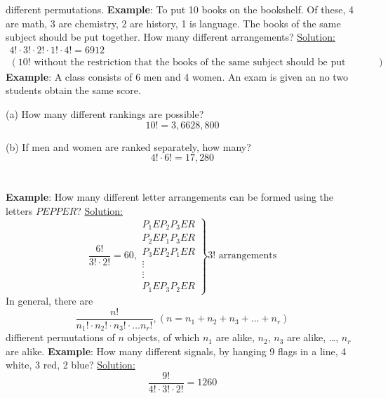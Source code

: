 \documentclass[11pt, letterpaper]{article}
\begin{document}
different permutations. \newline \newline
\noindent
\textbf{Example}: To put 10 books on the bookshelf. Of these, 4 are math, 3 are chemistry, 2 are history, 1 is language. The books of the same subject should be put together. How many different arrangements? \newline \newline
\noindent
\underline{Solution:}
\begin{multline*}
  4! \cdot 3! \cdot 2! \cdot 1! \cdot 4! = 6912 \\
  (10!\text{ without the restriction that the books of the same subject should be put together})
\end{multline*}
\textbf{Example}: A class consists of 6 men and 4 women. An exam is given an no two students obtain the same score.

(a) How many different rankings are possible?
\begin{equation*}
  10! = 3,6628,800
\end{equation*}

(b) If men and women are ranked separately, how many?
\begin{equation*}
  4! \cdot 6! = 17,280
\end{equation*} \\ \\
\noindent
\textbf{Example}: How many different letter arrangements can be formed using the letters $PEPPER$? \newline \newline
\noindent
\underline{Solution:}
\begin{equation*}
\frac{6!}{3!\cdot2!} = 60, \left.
  \begin{array}{r}
    P_1EP_2P_3ER \\
    P_2EP_1P_3ER \\
    P_3EP_2P_1ER \\
    \vdots       \\
    \vdots       \\
    P_1EP_3P_2ER
  \end{array} \right\} 3! \text{ arrangements}
\end{equation*}
\newline \noindent
In general, there are
\begin{equation*}
  \frac{n!}{
    n_1!\cdot n_2!\cdot n_3!\cdot \dots n_r!
  },  (n = n_1 + n_2 + n_3 + \dots + n_r)
\end{equation*}
diffierent permutations of $n$ objects, of which $n_1$ are alike, $n_2$, $n_3$ are alike, \dots , $n_r$ are alike. \newline \newline
\noindent
\textbf{Example}: How many different signals, by hanging 9 flags in a line, 4 white, 3 red, 2 blue? \newline \newline
\noindent
\underline{Solution:}
\begin{equation*}
  \frac{9!}{4! \cdot 3! \cdot 2!} = 1260
\end{equation*} \\ \\
\end{document}
